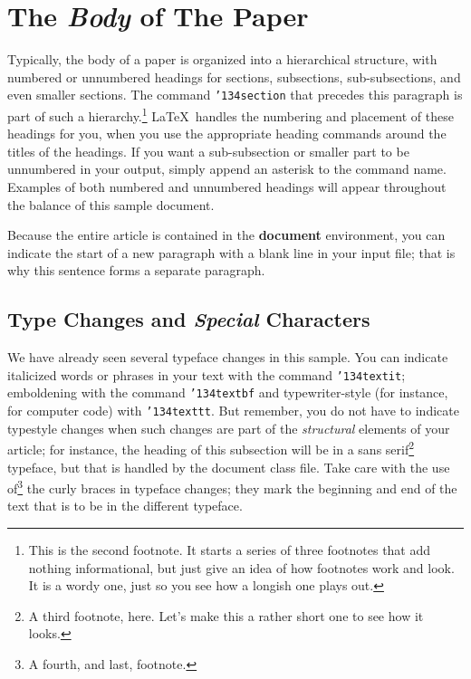 \documentclass[article]{stucosrec}
\begin{document}
	\section{The \textit{Body} of The Paper}
	
	Typically, the body of a paper is organized into a hierarchical structure, with numbered or unnumbered headings for sections, subsections, sub-subsections, and even smaller sections.  The command \texttt{{\char'134}section} that precedes this paragraph is part of such a hierarchy.\footnote{This is the second footnote. It starts a series of three footnotes that add nothing informational, but just give an idea of how footnotes work and look. It is a wordy one, just so you see how a longish one plays out.} \LaTeX\ handles the numbering and placement of these headings for you, when you use the appropriate heading commands around the titles of the headings.
	If you want a sub-subsection or smaller part to be unnumbered in your output, simply append an asterisk to the command name.
	Examples of both numbered and unnumbered headings will appear throughout the balance of this sample document.
	
	Because the entire article is contained in the \textbf{document} environment, you can indicate the start of a new paragraph with a blank line in your input file; that is why this sentence forms a separate paragraph.
	
	\subsection{Type Changes and \textit{Special} Characters}
	
	We have already seen several typeface changes in this sample.
	You can indicate italicized words or phrases in your text with the command \texttt{{\char'134}textit}; emboldening with the command \texttt{{\char'134}textbf} and typewriter-style (for instance, for computer code) with \texttt{{\char'134}texttt}.
	But remember, you do not have to indicate typestyle changes when such changes are part of the \textit{structural} elements of your 	article; for instance, the heading of this subsection will be in a sans serif\footnote{A third footnote, here. Let's make this a rather short one to see how it looks.} typeface, but that is handled by the document class file. Take care with the use of\footnote{A fourth, and last, footnote.} the curly braces in typeface changes; they mark the beginning and end of the text that is to be in the different typeface.
	
\end{document}
